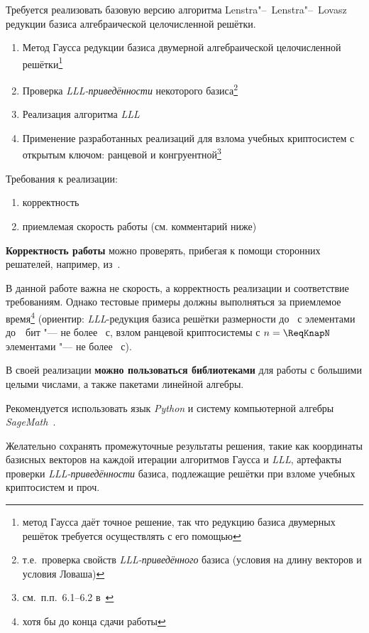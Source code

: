 \documentclass{ca-capstone}
\begin{document}


\goal
Требуется реализовать базовую версию алгоритма Lenstra"--~Lenstra"--~Lovasz редукции базиса
алгебраической целочисленной решётки.

\functionality
\begin{enumerate}
  \item Метод Гаусса редукции базиса двумерной алгебраической целочисленной
    решётки\footnote{метод Гаусса даёт точное решение, так что редукцию базиса двумерных решёток
    требуется осуществлять с его помощью}
  \item Проверка \emph{LLL-приведённости} некоторого базиса\footnote{т.е.\ проверка свойств
    \emph{LLL-приведённого} базиса (условия на длину векторов и условия Ловаша)}
  \item Реализация алгоритма \emph{LLL}
  \item Применение разработанных реализаций для взлома учебных криптосистем с открытым ключом:
    ранцевой и конгруентной\footnote{см.\ п.п.~6.1--6.2 в~\cite{hps}}
\end{enumerate}

\requirements
Требования к реализации:
\begin{enumerate}
  \item корректность
  \item приемлемая скорость работы (см. комментарий ниже)
\end{enumerate}

\textbf{Корректность работы} можно проверять, прибегая к помощи сторонних решателей, например,
из~\cite{sagemath}.

В данной работе важна не скорость, а корректность реализации и соответствие требованиям. Однако
тестовые примеры должны выполняться за приемлемое время\footnote{хотя бы до конца сдачи работы
\smiley} (ориентир: \emph{LLL}-редукция базиса решётки размерности до~\ReqDim{} с элементами
до~\ReqBits~бит "--- не более \ReqSeconds~с, взлом ранцевой криптосистемы с $n = \ReqKnapN$
элементами "--- не более \ReqKnapSeconds~с).

\details
В своей реализации \textbf{можно пользоваться библиотеками} для работы с большими целыми
числами, а также пакетами линейной алгебры.

Рекомендуется использовать язык \emph{Python} и систему компьютерной алгебры
\emph{SageMath}~\cite{sagemath}.

Желательно сохранять промежуточные результаты решения, такие как координаты базисных векторов на
каждой итерации алгоритмов Гаусса и \emph{LLL}, артефакты проверки \emph{LLL-приведённости}
базиса, подлежащие решётки при взломе учебных криптосистем и проч.
\end{document}
